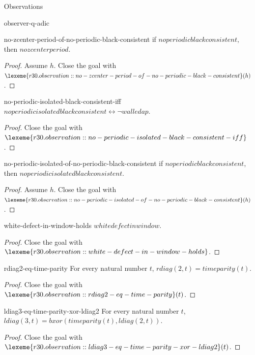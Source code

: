 \begin{lexlean}{Observations}
\begin{section}{observer-q-adic}
\begin{theorem}{no-zcenter-period-of-no-periodic-black-consistent}
if \(noperiodicblackconsistent\), then \(nozcenterperiod\).
\begin{proof}
Assume \(h\).
Close the goal with \(\lexeme{r30.observation::no-zcenter-period-of-no-periodic-black-consistent}(h)\).
\end{proof}
\end{theorem}

\begin{theorem}{no-periodic-isolated-black-consistent-iff}
\(noperiodicisolatedblackconsistent ↔ ¬ walledap\).
\begin{proof}
Close the goal with \(\lexeme{r30.observation::no-periodic-isolated-black-consistent-iff}\).
\end{proof}
\end{theorem}

\begin{theorem}{no-periodic-isolated-of-no-periodic-black-consistent}
if \(noperiodicblackconsistent\), then \(noperiodicisolatedblackconsistent\).
\begin{proof}
Assume \(h\).
Close the goal with \(\lexeme{r30.observation::no-periodic-isolated-of-no-periodic-black-consistent}(h)\).
\end{proof}
\end{theorem}

\begin{theorem}{white-defect-in-window-holds}
\(whitedefectinwindow\).
\begin{proof}
Close the goal with \(\lexeme{r30.observation::white-defect-in-window-holds}\).
\end{proof}
\end{theorem}

\begin{theorem}{rdiag2-eq-time-parity}
For every natural number \(t\), \(rdiag(2, t) = timeparity(t)\).
\begin{proof}
Close the goal with \(\lexeme{r30.observation::rdiag2-eq-time-parity}(t)\).
\end{proof}
\end{theorem}

\begin{theorem}{ldiag3-eq-time-parity-xor-ldiag2}
For every natural number \(t\), \(ldiag(3, t) = bxor(timeparity(t), ldiag(2, t))\).
\begin{proof}
Close the goal with \(\lexeme{r30.observation::ldiag3-eq-time-parity-xor-ldiag2}(t)\).
\end{proof}
\end{theorem}


\end{section}
\end{lexlean}
